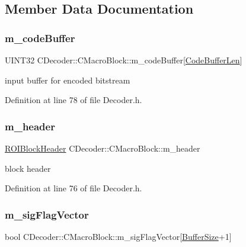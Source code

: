 \subsection{Member Data Documentation}
\mbox{\label{classCDecoder_1_1CMacroBlock_ace0702d7f8281972b1db091248c3c80b}} 
\subsubsection{\texorpdfstring{m\_codeBuffer}{m\_codeBuffer}}
{\footnotesize\ttfamily U\+I\+N\+T32 C\+Decoder\+::\+C\+Macro\+Block\+::m\+\_\+code\+Buffer\mbox{[}\mbox{\hyperlink{Encoder_8h_a05a74e73e6c734fcad194efbca053ed5}{Code\+Buffer\+Len}}\mbox{]}}



input buffer for encoded bitstream 



Definition at line 78 of file Decoder.\+h.

\mbox{\label{classCDecoder_1_1CMacroBlock_a19247bd5e6073252c45abf9d33b44ee0}} 
\subsubsection{\texorpdfstring{m\_header}{m\_header}}
{\footnotesize\ttfamily \mbox{\hyperlink{unionROIBlockHeader}{R\+O\+I\+Block\+Header}} C\+Decoder\+::\+C\+Macro\+Block\+::m\+\_\+header}



block header 



Definition at line 76 of file Decoder.\+h.

\mbox{\label{classCDecoder_1_1CMacroBlock_af6931769654b397d6c3becae44e868b0}} 
\subsubsection{\texorpdfstring{m\_sigFlagVector}{m\_sigFlagVector}}
{\footnotesize\ttfamily bool C\+Decoder\+::\+C\+Macro\+Block\+::m\+\_\+sig\+Flag\+Vector\mbox{[}\mbox{\hyperlink{PGFtypes_8h_aa362edf6db9662acf6ef958a6db19c35}{Buffer\+Size}}+1\mbox{]}\hspace{0.3cm}{\ttfamily [private]}}



